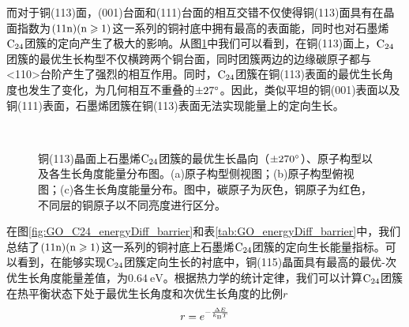 而对于铜(113)面，(001)台面和(111)台面的相互交错不仅使得铜(113)面具有在晶面指数为$\rm{(11n)(n \geqslant 1)}$这一系列的铜衬底中拥有最高的表面能，同时也对石墨烯$\rm{C_{24}}$团簇的定向产生了极大的影响。从图\ref{GO_C24_113}中我们可以看到，在铜(113)面上，$\rm{C_{24}}$团簇的最优生长构型不仅横跨两个铜台面，同时团簇两边的边缘碳原子都与<110>台阶产生了强烈的相互作用。同时，$\rm{C_{24}}$团簇在铜(113)表面的最优生长角度也发生了变化，为几何相互不重叠的$\SI{\pm 27 }{\degree}$。因此，类似平坦的铜(001)表面以及铜(111)表面，石墨烯团簇在铜(113)表面无法实现能量上的定向生长。

\begin{figure}[htb]
    \\[-0.5ex]
    \caption{铜(113)晶面上石墨烯$\rm{C_{24}}$团簇的最优生长晶向（$\SI{\pm 270}{\degree}$）、原子构型以及各生长角度能量分布图。(a)原子构型侧视图；(b)原子构型俯视图；(c)各生长角度能量分布。图中，碳原子为灰色，铜原子为红色，不同层的铜原子以不同亮度进行区分。}
    \label{GO_C24_113}
\end{figure}

在图\ref{fig:GO_C24_energyDiff_barrier}和表\ref{tab:GO_energyDiff_barrier}中，我们总结了$\rm{(11n)(n \geqslant 1)}$这一系列的铜衬底上石墨烯$\rm{C_{24}}$团簇的定向生长能量指标。可以看到，在能够实现$\rm{C_{24}}$团簇定向生长的衬底中，铜(115)晶面具有最高的最优-次优生长角度能量差值，为$\SI{0.64 }{\electronvolt}$。根据热力学的统计定律，我们可以计算$\rm{C_{24}}$团簇在热平衡状态下处于最优生长角度和次优生长角度的比例$r$\chinesecolon
\begin{equation}
    r=e^{-\frac{\Delta E}{k_{\rm B}T}}
\end{equation}

